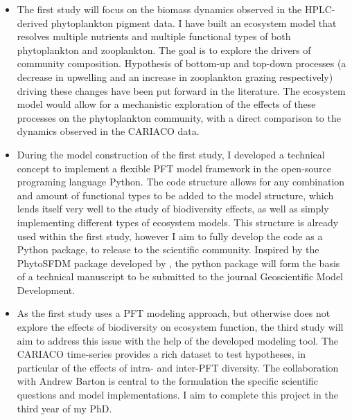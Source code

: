 \begin{itemize}
\item The first study will focus on the biomass dynamics observed in the HPLC-derived phytoplankton pigment data. I have built an ecosystem model that resolves multiple nutrients and multiple functional types of both phytoplankton and zooplankton. The goal is to explore the drivers of community composition. Hypothesis of bottom-up and top-down processes (a decrease in upwelling and an increase in zooplankton grazing respectively) driving these changes have been put forward in the literature. The ecosystem model would allow for a mechanistic exploration of the effects of these processes on the phytoplankton community, with a direct comparison to the dynamics observed in the CARIACO data.
\item During the model construction of the first study, I developed a technical concept to implement a flexible PFT model framework in the open-source programing language Python. The code structure allows for any combination and amount of functional types to be added to the model structure, which lends itself very well to the study of biodiversity effects, as well as simply implementing different types of ecosystem models. This structure is already used within the first study, however I aim to fully develop the code as a Python package, to release to the scientific community. Inspired by the PhytoSFDM package developed by \citet{Acevedo-Trejos2016}, the python package will form the basis of a technical manuscript to be submitted to the journal Geoscientific Model Development.
\item As the first study uses a PFT modeling approach, but otherwise does not explore the effects of biodiversity on ecosystem function, the third study will aim to address this issue with the help of the  developed modeling tool. The CARIACO time-series provides a rich dataset to test hypotheses, in particular of the effects of intra- and inter-PFT diversity. The collaboration with Andrew Barton is central to the formulation the specific scientific questions and model implementations. I aim to complete this project in the third year of my PhD. 
\end{itemize}
